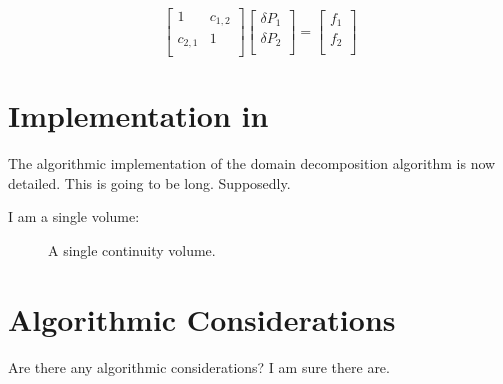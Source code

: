   \begin{equation}
\label{eqn:domainDecomp5}
 \begin{bmatrix} 
1 & c_{1,2}  \\
c_{2,1} & 1 \\
 \end{bmatrix} \begin{bmatrix}
 \delta P_{1} \\
 \delta P_{2} \\
\end{bmatrix}  = \begin{bmatrix}
 f_1 \\
 f_2 \\
\end{bmatrix}
 \end{equation}

\section{Implementation in \cobra{}}
\label{sec:dd_algo}

The algorithmic implementation of the domain decomposition algorithm is now detailed.
This is going to be long.
Supposedly.

I am a single volume:

\begin{figure}[ht]
\centering

\caption{A single continuity volume.}
\label{fig:single3dvol}
\end{figure}


\section{Algorithmic Considerations}
\label{sect:dd_algo_con}

Are there any algorithmic considerations?
I am sure there are.
